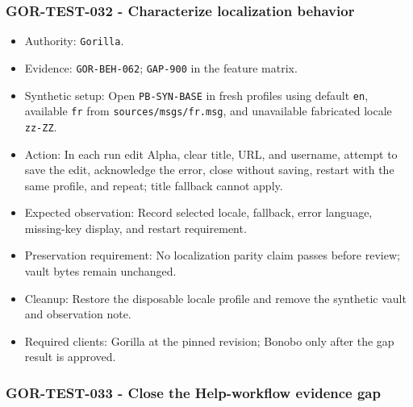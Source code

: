 \documentclass[
  letterpaper,
]{article}
\newcommand{\passthrough}[1]{#1}
\providecommand{\tightlist}{%
  \setlength{\itemsep}{0pt}\setlength{\parskip}{0pt}}
\begin{document}
\subsubsection{GOR-TEST-032 - Characterize localization
behavior}\label{gor-test-032---characterize-localization-behavior}

\begin{itemize}
\tightlist
\item
  Authority: \passthrough{\lstinline!Gorilla!}.
\item
  Evidence: \nolinkurl{GOR-BEH-062}; \passthrough{\lstinline!GAP-900!} in the feature matrix.
\item
  Synthetic setup: Open \nolinkurl{PB-SYN-BASE} in fresh profiles using default \passthrough{\lstinline!en!}, available
  \passthrough{\lstinline!fr!} from \nolinkurl{sources/msgs/fr.msg}, and unavailable fabricated locale
  \passthrough{\lstinline!zz-ZZ!}.
\item
  Action: In each run edit Alpha, clear title, URL, and username, attempt to save the edit, acknowledge the error, close
  without saving, restart with the same profile, and repeat; title fallback cannot apply.
\item
  Expected observation: Record selected locale, fallback, error language, missing-key display, and restart requirement.
\item
  Preservation requirement: No localization parity claim passes before review; vault bytes remain unchanged.
\item
  Cleanup: Restore the disposable locale profile and remove the synthetic vault and observation note.
\item
  Required clients: Gorilla at the pinned revision; Bonobo only after the gap result is approved.
\end{itemize}

\subsubsection{GOR-TEST-033 - Close the Help-workflow evidence
gap}\label{gor-test-033---close-the-help-workflow-evidence-gap}
\end{document}
